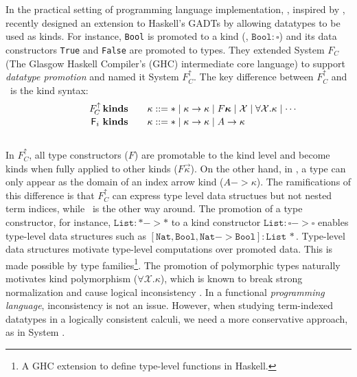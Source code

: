 In the practical setting of programming language implementation,
\citet{YorgeyWCJVM12}, inspired by \citet{SHE}, recently designed an extension
to Haskell's GADTs by allowing datatypes to be used as kinds. For instance,
\texttt{Bool} is promoted to a kind (\ie, $\texttt{Bool}:\square$) and its
data constructors \texttt{True} and \texttt{False} are promoted to types.
They extended System $F_{\!C}$ (The Glasgow Haskell Compiler's
(GHC) intermediate core language) to support \emph{datatype promotion}
and named it System $F_{\!C}^\uparrow$. The key difference between
$F_{\!C}^\uparrow$ and \Fi\ is the kind syntax: %
\vspace*{-2pt}
\[\qquad\quad
\begin{array}{ll}
F_{\!C}^\uparrow\,\textbf{kinds}\quad &
\kappa ::= * \mid \kappa -> \kappa \mid F \vec{\kappa} \mid \mathcal{X} \mid \forall \mathcal{X}.\kappa \mid \cdots \\
\,\Fi\,\,\textbf{kinds}\quad &
\kappa ::= * \mid \kappa -> \kappa \mid A -> \kappa \phantom{A^{A^A}}
\end{array}  
\] ~\vspace*{-6pt}\\
In $F_{\!C}^\uparrow$, all type constructors ($F$) are promotable to the 
kind level and become kinds when fully applied to other kinds
($F\vec\kappa$). On the other hand, in \Fi,  a type can only appear
as the domain of an index arrow kind ($A-> \kappa$).
The ramifications of this difference is that $F_{\!C}^\uparrow$ can
express type level data structues but not nested term indices,
while \Fi\ is the other way around. The promotion of
a type constructor, for instance, $\texttt{List}:* -> *$ to a kind constructor
$\texttt{List}:\square-> \square$ enables type-level data structures
such as $\mathtt{[Nat,Bool,Nat-> Bool]:List\,*}$. Type-level
data structures motivate type-level computations over promoted data.
This is made possible by type families\footnote{
	A GHC extension to define type-level functions in Haskell.}.
The promotion of polymorphic types naturally motivates
kind polymorphism ($\forall \mathcal{X}.\kappa$), which is known to
break strong normalization and cause logical inconsistency \cite{Girard72}.
In a functional {\em programming language},
inconsistency is not an issue. However, when studying
term-indexed datatypes in a logically consistent calculi, we need
a more conservative approach, as in System \Fi.

